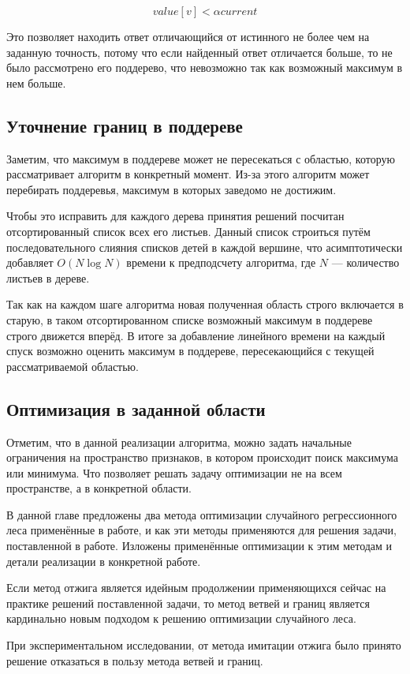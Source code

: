 \[
    value[v] < \alpha current
\]

Это позволяет находить ответ отличающийся от истинного не более чем на заданную
точность, потому что если найденный ответ отличается больше, то не было
рассмотрено его поддерево, что невозможно так как возможный максимум в нем
больше.

\subsection{Уточнение границ в поддереве}

Заметим, что максимум в поддереве может не пересекаться с областью, которую
рассматривает алгоритм в конкретный момент. Из-за этого алгоритм может
перебирать поддеревья, максимум в которых заведомо не достижим.

Чтобы это исправить для каждого дерева принятия решений посчитан отсортированный
список всех его листьев. Данный список строиться путём последовательного слияния
списков детей в каждой вершине, что асимптотически добавляет $O(N \log{N})$
времени к предподсчету алгоритма, где $N$ --- количество листьев в дереве.

Так как на каждом шаге алгоритма новая полученная область строго включается
в старую, в таком отсортированном списке возможный максимум в поддереве строго
движется вперёд. В итоге за добавление линейного времени на каждый спуск
возможно оценить максимум в поддереве, пересекающийся с текущей рассматриваемой
областью.

\subsection{Оптимизация в заданной области}

Отметим, что в данной реализации алгоритма, можно задать начальные ограничения
на пространство признаков, в котором происходит поиск максимума или минимума.
Что позволяет решать задачу оптимизации не на всем пространстве, а в конкретной
области.

\chapterconclusion

В данной главе предложены два метода оптимизации случайного регрессионного леса
применённые в работе, и как эти методы применяются для решения задачи,
поставленной в работе. Изложены применённые оптимизации к этим методам и детали
реализации в конкретной работе.

Если метод отжига является идейным продолжении применяющихся сейчас на практике
решений поставленной задачи, то метод ветвей и границ является кардинально новым
подходом к решению оптимизации случайного леса.

При экспериментальном исследовании, от метода имитации отжига было принято решение
отказаться в пользу метода ветвей и границ.
